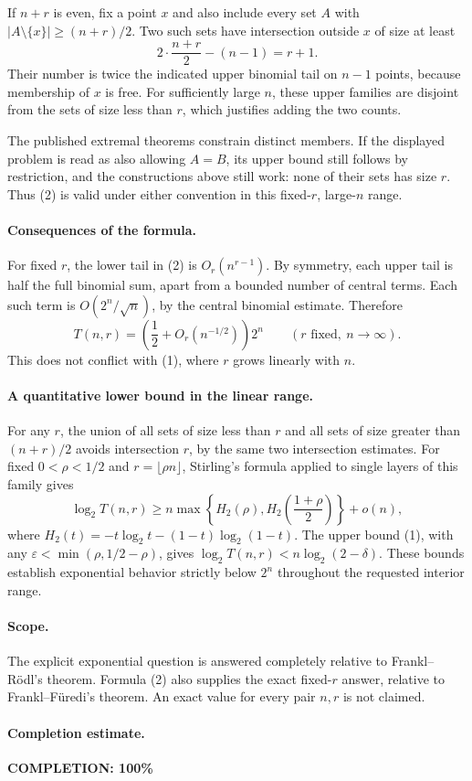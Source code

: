 If \(n+r\) is even, fix a point \(x\) and also include every
set \(A\) with \(|A\setminus\{x\}|\geq(n+r)/2\).
Two such sets have intersection outside \(x\) of size at least
\[
 2\cdot\frac{n+r}{2}-(n-1)=r+1.
\]
Their number is twice the indicated upper binomial tail
on \(n-1\) points, because membership of \(x\) is free.
For sufficiently large \(n\), these upper families are
disjoint from the sets of size less than \(r\), which
justifies adding the two counts.

The published extremal theorems constrain distinct members.
If the displayed problem is read as also allowing \(A=B\),
its upper bound still follows by restriction, and the
constructions above still work: none of their sets has
size \(r\). Thus (2) is valid under either convention
in this fixed-\(r\), large-\(n\) range.

\paragraph{Consequences of the formula.}
For fixed \(r\), the lower tail in (2) is \(O_r(n^{r-1})\).
By symmetry, each upper tail is half the full binomial sum,
apart from a bounded number of central terms. Each such term
is \(O(2^n/\sqrt n)\), by the central binomial estimate.
Therefore
\[
 T(n,r)=\left(\frac12+O_r(n^{-1/2})\right)2^n
 \qquad(r\text{ fixed},\ n\longrightarrow\infty).               \tag{3}
\]
This does not conflict with (1), where \(r\) grows linearly
with \(n\).

\paragraph{A quantitative lower bound in the linear range.}
For any \(r\), the union of all sets of size less than \(r\)
and all sets of size greater than \((n+r)/2\) avoids
intersection \(r\), by the same two intersection estimates.
For fixed \(0<\rho<1/2\) and \(r=\lfloor\rho n\rfloor\),
Stirling's formula applied to single layers of this family gives
\[
 \log_2 T(n,r)\geq
 n\max\left\{H_2(\rho),H_2\left(\frac{1+\rho}{2}\right)\right\}
 +o(n),
\]
where \(H_2(t)=-t\log_2t-(1-t)\log_2(1-t)\).
The upper bound (1), with any
\(\varepsilon<\min(\rho,1/2-\rho)\), gives
\(\log_2 T(n,r)<n\log_2(2-\delta)\).
These bounds establish exponential behavior strictly below
\(2^n\) throughout the requested interior range.

\paragraph{Scope.}
The explicit exponential question is answered completely
relative to Frankl--R\"odl's theorem. Formula (2) also supplies
the exact fixed-\(r\) answer, relative to Frankl--F\"uredi's
theorem. An exact value for every pair \(n,r\) is not claimed.

\paragraph{Completion estimate.}
\textbf{COMPLETION: 100\%}
